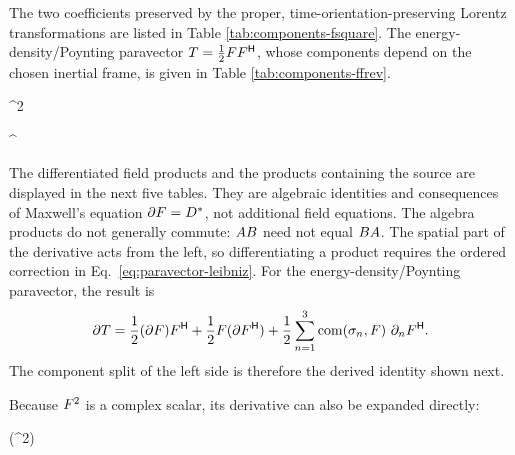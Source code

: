 \noindent The two coefficients preserved by the proper,
time-orientation-preserving Lorentz transformations are listed in Table
\ref{tab:components-fsquare}. The
energy-density/Poynting paravector
\(T=\tfrac12 F F^{\mathsf H}\), whose components depend on
the chosen inertial frame, is given in Table \ref{tab:components-ffrev}.
\begin{componenttable}{^{2}}
\end{componenttable}

\begin{componenttable}{ ^{\Hop}}
\end{componenttable}

\noindent
The differentiated field products and the products containing the source
are displayed in the next five tables. They are algebraic identities and
consequences of Maxwell's equation
\(\partial F=D^{*}\), not additional field equations.
The algebra products do not generally commute:
\(AB\) need not equal \(BA\). The spatial part of the
derivative acts from the left, so differentiating a product requires the
ordered correction in Eq.\ \eqref{eq:paravector-leibniz}. For the
energy-density/Poynting paravector, the result is
\begin{equation*}
\partial T
=\frac12(\partial F)F^{\mathsf H}
+\frac12F(\partial F^{\mathsf H})
+\frac12\sum_{n=1}^{3}
\operatorname{com}\!\left(\sigma_n,F\right)\,\partial_nF^{\mathsf H}.
\end{equation*}
The component split of the left side is therefore the derived identity
shown next.
\begin{componenttable}{\pv{\partial} }
\end{componenttable}

Because \(F^{2}\) is a complex scalar, its derivative can also be
expanded directly:
\begin{componenttable}{\pv{\partial}(^{2})}
\end{componenttable}

